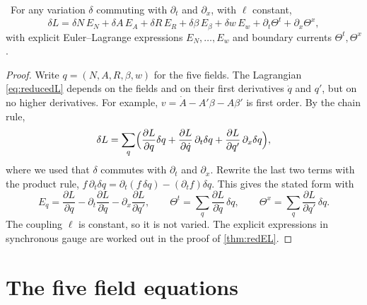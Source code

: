 \begin{theorem}\label{thm:redvar}\ver\
For any variation $\delta$ commuting with $\partial_t$ and $\partial_x$, with $\ell$ constant,
\[
\delta L=\delta N\,E_N+\delta A\,E_A+\delta R\,E_R+\delta\beta\,E_\beta+\delta w\,E_w+\partial_t\Theta^t+\partial_x\Theta^x,
\]
with explicit Euler--Lagrange expressions $E_N,\dots,E_w$ and boundary currents $\Theta^t,\Theta^x$.
\end{theorem}
\begin{proof}
Write $q=(N,A,R,\beta,w)$ for the five fields. The Lagrangian \eqref{eq:reducedL} depends on the fields and on their first derivatives $\dot q$ and $q'$, but on no higher derivatives. For example, $v=\dot A-A'\beta-A\beta'$ is first order. By the chain rule,
\[
\delta L=\sum_q\Bigl(\frac{\partial L}{\partial q}\delta q+\frac{\partial L}{\partial\dot q}\,\partial_t\delta q+\frac{\partial L}{\partial q'}\,\partial_x\delta q\Bigr),
\]
where we used that $\delta$ commutes with $\partial_t$ and $\partial_x$. Rewrite the last two terms with the product rule, $f\,\partial_t\delta q=\partial_t(f\,\delta q)-(\partial_tf)\delta q$. This gives the stated form with
\[
E_q=\frac{\partial L}{\partial q}-\partial_t\frac{\partial L}{\partial\dot q}-\partial_x\frac{\partial L}{\partial q'},\qquad
\Theta^t=\sum_q\frac{\partial L}{\partial\dot q}\,\delta q,\qquad\Theta^x=\sum_q\frac{\partial L}{\partial q'}\,\delta q .
\]
The coupling $\ell$ is constant, so it is not varied. The explicit expressions in synchronous gauge are worked out in the proof of \cref{thm:redEL}.
\end{proof}


\section{The five field equations}

